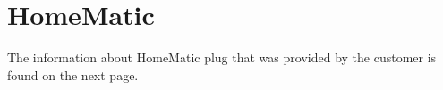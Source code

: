 \label{sec:homematic}
\chapter{HomeMatic}
The information about HomeMatic plug that was provided by the customer is found on the next page.


